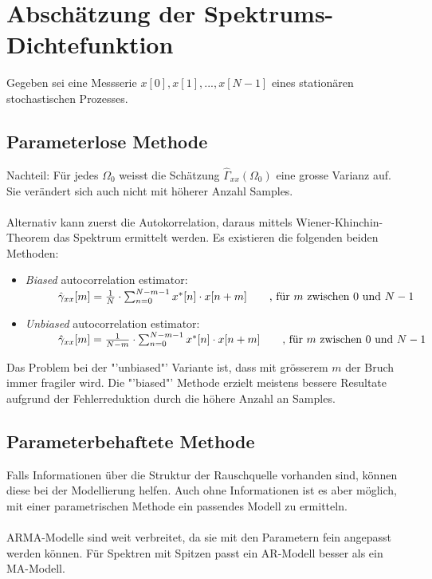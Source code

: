\section{Abschätzung der Spektrums-Dichtefunktion}
Gegeben sei eine Messserie $x[0], x[1],...,x[N-1]$ eines stationären stochastischen Prozesses.
\subsection{Parameterlose Methode}
Nachteil: Für jedes $\Omega_0$ weisst die Schätzung $\hat{\Gamma}_{xx}(\Omega_0)$ eine grosse Varianz auf.
Sie verändert sich auch nicht mit höherer Anzahl Samples.\\\\
Alternativ kann zuerst die Autokorrelation, daraus mittels Wiener-Khinchin-Theorem das Spektrum
ermittelt werden. Es existieren die folgenden beiden Methoden:
\begin{itemize}[noitemsep,topsep=3pt]
	\item \emph{Biased} autocorrelation estimator:  \\
								$\hspace{10mm} \hat{\gamma}_{xx}[m]=\frac{1}{N} \cdot \sum_{n=0}^{N-m-1} x^*[n]\cdot x[n+m] 
								\qquad \text{, für } m \text{ zwischen 0 und } N-1$
	\item \emph{Unbiased} autocorrelation estimator:\\
								$\hspace{10mm} \hat{\gamma}_{xx}[m]=\frac{1}{N-m} \cdot \sum_{n=0}^{N-m-1} x^*[n]\cdot x[n+m] 
								\qquad \text{, für } m \text{ zwischen 0 und } N-1$
\end{itemize}
Das Problem bei der "'unbiased"' Variante ist, dass mit grösserem $m$ der Bruch immer fragiler wird.
Die "'biased"' Methode erzielt meistens bessere Resultate aufgrund der Fehlerreduktion durch die höhere
Anzahl an Samples. 
\subsection{Parameterbehaftete Methode}
Falls Informationen über die Struktur der Rauschquelle vorhanden sind, 
können diese bei der Modellierung helfen. Auch ohne Informationen ist es 
aber möglich, mit einer parametrischen Methode ein passendes Modell zu 
ermitteln. \\\\
ARMA-Modelle sind weit verbreitet, da sie mit den Parametern fein angepasst werden können. 
Für Spektren mit Spitzen passt ein AR-Modell besser als ein MA-Modell.